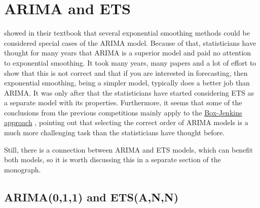 \documentclass[]{book}
\theoremstyle{definition}
\theoremstyle{definition}
\theoremstyle{definition}
\theoremstyle{definition}
\theoremstyle{remark}
\begin{document}
\hypertarget{ARIMAandETS}{%
\section{ARIMA and ETS}\label{ARIMAandETS}}

\citet{Box1976} showed in their textbook that several exponential smoothing methods could be considered special cases of the ARIMA model. Because of that, statisticians have thought for many years that ARIMA is a superior model and paid no attention to exponential smoothing. It took many years, many papers and a lot of effort \citep{Makridakis1982, Fildes1998, Makridakis2000} to show that this is not correct and that if you are interested in forecasting, then exponential smoothing, being a simpler model, typically does a better job than ARIMA. It was only after \citet{Ord1997} that the statisticians have started considering ETS as a separate model with its properties. Furthermore, it seems that some of the conclusions from the previous competitions mainly apply to the \protect\hyperlink{BJApproach}{Box-Jenkins approach} \citep[for example, see][]{Makridakis1997}, pointing out that selecting the correct order of ARIMA models is a much more challenging task than the statisticians have thought before.

Still, there is a connection between ARIMA and ETS models, which can benefit both models, so it is worth discussing this in a separate section of the monograph.

\hypertarget{ARIMAETS011}{%
\subsection{ARIMA(0,1,1) and ETS(A,N,N)}\label{ARIMAETS011}}
\end{document}
